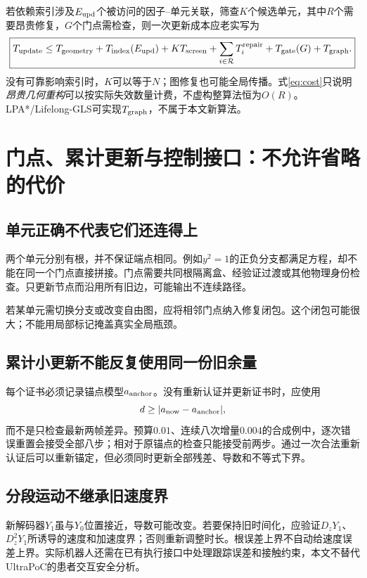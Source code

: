 \documentclass[UTF8,11pt,a4paper,fontset=fandol]{ctexart}
\numberwithin{equation}{section}
\theoremstyle{definition}
\begin{document}
若依赖索引涉及$E_{\rm upd}$个被访问的因子--单元关联，筛查$K$个候选单元，其中$R$个需要昂贵修复，$G$个门点需检查，则一次更新成本应老实写为
\begin{equation}
 \boxed{
 T_{\rm update}
 \le T_{\rm geometry}+T_{\rm index}(E_{\rm upd})
 +K T_{\rm screen}+\sum_{i\in\mathcal R}T_i^{\rm repair}
 +T_{\rm gate}(G)+T_{\rm graph}.
 }
 \label{eq:cost}
\end{equation}
没有可靠影响索引时，$K$可以等于$N$；图修复也可能全局传播。式\eqref{eq:cost}只说明\emph{昂贵几何重构}可以按实际失效数量计费，不虚构整算法恒为$O(R)$。LPA*/Lifelong-GLS可实现$T_{\rm graph}$，不属于本文新算法\cite{lpa,lgls}。

\section{门点、累计更新与控制接口：不允许省略的代价}
\subsection{单元正确不代表它们还连得上}
两个单元分别有根，并不保证端点相同。例如$y^2=1$的正负分支都满足方程，却不能在同一个门点直接拼接。门点需要共同根隔离盒、经验证过渡或其他物理身份检查。只更新节点而沿用所有旧边，可能输出不连续路径。

若某单元需切换分支或改变自由图，应将相邻门点纳入修复闭包。这个闭包可能很大；不能用局部标记掩盖真实全局瓶颈。

\subsection{累计小更新不能反复使用同一份旧余量}
每个证书必须记录锚点模型$a_{\rm anchor}$。没有重新认证并更新证书时，应使用
\begin{equation}
 d\ge |a_{\mathrm{now}}-a_{\rm anchor}|,
\end{equation}
而不是只检查最新两帧差异。预算$0.01$、连续八次增量$0.004$的合成例中，逐次错误重置会接受全部八步；相对于原锚点的检查只能接受前两步。通过一次合法重新认证后可以重新锚定，但必须同时更新全部残差、导数和不等式下界。

\subsection{分段运动不继承旧速度界}
新解码器$Y_1$虽与$Y_0$位置接近，导数可能改变。若要保持旧时间化，应验证$D_zY_1$、$D_z^2Y_1$所诱导的速度和加速度界；否则重新调整时长。根误差上界不自动给速度误差上界。实际机器人还需在已有执行接口中处理跟踪误差和接触约束，本文不替代UltraPoC的患者交互安全分析。
\end{document}

